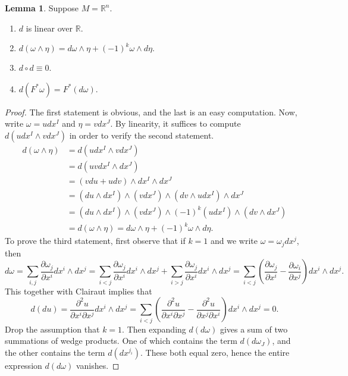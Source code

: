 \documentclass[10pt,letterpaper,cm]{nupset}
\theoremstyle{definition}
\theoremstyle{theorem}
\newtheorem{lemma}[definition]{Lemma}
\theoremstyle{remark}
\newcommand{\R}{\mathbb R}
\newcommand{\1}{\mathbf{1}}
\newcommand{\0}{\vec 0}
\begin{document}
\begin{lemma}\label{l15} Suppose $M = \R^n$.
\begin{enumerate}
\item $d$ is linear over $\R$.
\item $d( \omega \wedge \eta) = d \omega \wedge \eta + (-1)^k\omega \wedge d \eta.$
\item $d \circ d \equiv 0$.
\item $d(F^{\ast} \omega) = F^{\ast}(d \omega).$
\end{enumerate}
\end{lemma}
\begin{proof}
The first statement is obvious, and the last is an easy computation. Now, write $\omega = udx^I$ and $\eta = v dx^J$. By linearity, it suffices to compute $d(udx^I \wedge v dx^J)$ in order to verify the second statement. 
\begin{align*}
 d(\omega \wedge \eta) &= d(udx^I \wedge vdx^J) \\
& = d(uvdx^I \wedge dx^J)
\\ & = (vdu + udv) \wedge dx^I \wedge dx^J
\\ & = (du \wedge dx^I) \wedge (v dx^J) \wedge (dv \wedge u dx^I) \wedge dx^J
\\ & = (du \wedge dx^I) \wedge (v dx^J) \wedge (-1)^k(udx^I) \wedge (dv \wedge dx^J)
\\ & = d( \omega \wedge \eta) = d \omega \wedge \eta + (-1)^k\omega \wedge d \eta .
\end{align*}
To prove the third statement, first observe that if $k=1$ and we write $\omega = \omega_jdx^j$, then $$d \omega =   \sum_{i, j}\frac{\partial{\omega_j}}{\partial{x^i}}dx^i \wedge dx^j = \sum_{i< j}\frac{\partial{\omega_j}}{\partial{x^i}}dx^i \wedge dx^j + \sum_{i>j}\frac{\partial{\omega_j}}{\partial{x^i}}dx^i \wedge dx^j =\sum_{i<j}(\frac{\partial{\omega_j}}{\partial{x^i}} - \frac{\partial{\omega_i}}{\partial{x^j}})dx^i \wedge dx^j.$$ This together with Clairaut implies that  $$d(du) =\frac{\partial^2{u}}{\partial{x^i}\partial{x^j}}dx^i \wedge dx^j = \sum_{i<j}( \frac{\partial^2{u}}{\partial{x^i}\partial{x^j}} - \frac{\partial^2{u}}{\partial{x^j}\partial{x^i}})dx^i \wedge dx^j = 0.  $$ Drop the assumption that $k=1$. Then expanding $d(d\omega)$ gives a sum of two summations of wedge products. One of which contains the term $d(d\omega_J)$, and the other contains the term $d(dx^{j_i})$. These both equal zero, hence the entire expression $d(d\omega)$ vanishes.
\end{proof}
\end{document}
